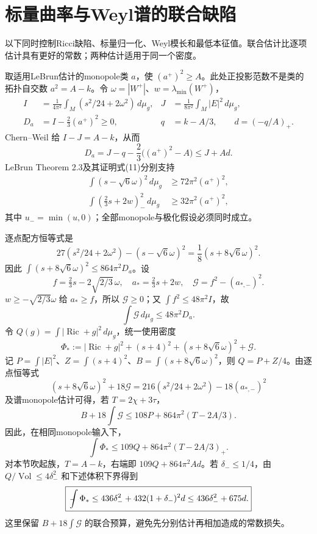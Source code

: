 \documentclass[UTF8,a4paper,11pt,fontset=fandol]{ctexart}
\numberwithin{equation}{section}
\theoremstyle{definition}
\newcommand{\Ric}{\operatorname{Ric}}
\newcommand{\Vol}{\operatorname{Vol}}
\newcommand{\dd}{\,d\mu_g}
\newcommand{\fint}{\mathop{\rlap{\,\raisebox{0.1ex}{\tiny$-$}}\int}\nolimits}
\begin{document}
\section{标量曲率与Weyl谱的联合缺陷}
以下同时控制Ricci缺陷、标量归一化、Weyl模长和最低本征值。联合估计比逐项估计具有更好的常数；两种估计适用于同一个密度。

取适用LeBrun估计的monopole类 $a$，使 $(a^+)^2\ge A$。此处正投影范数不是类的拓扑自交数 $a^2=A-k$。令 $\omega=|W^+|$、$w=\lambda_{\min}(W^+)$，
\begin{align}
 I&=\frac1{4\pi^2}\int_M(s^2/24+2\omega^2)\dd,
 &J&=\frac1{8\pi^2}\int_M|E|^2\dd,\\
 D_a&=I-\frac23(a^+)^2\ge0,
 &q&=k-A/3,\qquad d=(-q/A)_+.
\end{align}
Chern--Weil 给 $I-J=A-k$，从而
\begin{equation}\label{eq:Da}
D_a=J-q-\frac23\big((a^+)^2-A\big)\le J+Ad.
\end{equation}
LeBrun Theorem 2.3及其证明式(11)分别支持
\begin{align}
\int(s-\sqrt6\omega)^2\dd&\ge72\pi^2(a^+)^2,\\
\int\left(\frac23s+2w\right)_{-}^{\!2}\dd&\ge32\pi^2(a^+)^2,
\end{align}
其中 $u_-=\min(u,0)$；全部monopole与极化假设必须同时成立\cite{LeBrun2001}。

逐点配方恒等式是
\begin{equation}\label{eq:square}
27(s^2/24+2\omega^2)-(s-\sqrt6\omega)^2
=\frac18(s+8\sqrt6\omega)^2.
\end{equation}
因此 $\int(s+8\sqrt6\omega)^2\le864\pi^2D_a$。设
\[
f=\tfrac23s-2\sqrt{2/3}\,\omega,\quad a_*=\tfrac23s+2w,
\quad\mathcal G=f^2-(a_{*,-})^2.
\]
$w\ge-\sqrt{2/3}\omega$ 给 $a_*\ge f$，所以 $\mathcal G\ge0$；又 $\int f^2\le48\pi^2I$，故
\begin{equation}
\int\mathcal G\dd\le48\pi^2D_a.
\end{equation}
令 $Q(g)=\int|\Ric+g|^2\dd$，统一使用密度
\begin{equation}\label{eq:Phistar}
\Phi_*:=|\Ric+g|^2+(s+4)^2+(s+8\sqrt6\omega)^2+\mathcal G.
\end{equation}
记 $P=\int|E|^2$、$Z=\int(s+4)^2$、$B=\int(s+8\sqrt6\omega)^2$，则 $Q=P+Z/4$。由逐点恒等式
\begin{equation}\label{eq:joint-density-identity}
(s+8\sqrt6\omega)^2+18\mathcal G
=216(s^2/24+2\omega^2)-18(a_{*,-})^2
\end{equation}
及谱monopole估计可得，若 $T=2\chi+3\tau$，
\[
B+18\int\mathcal G\le108P+864\pi^2(T-2A/3).
\]
因此，在相同monopole输入下，
\begin{equation}\label{eq:109}
\boxed{\int\Phi_*\le109Q+864\pi^2(T-2A/3)_+.}
\end{equation}
对本节吹起族，$T=A-k$，右端即 $109Q+864\pi^2Ad$。若 $\delta_-\le1/4$，由 $Q/\Vol\le4\delta_-^2$ 和下述体积下界得到
\begin{equation}\label{eq:436675}
\boxed{\fint\Phi_*\le436\delta_-^2+432(1+\delta_-)^2d
\le436\delta_-^2+675d.}
\end{equation}
这里保留 $B+18\int\mathcal G$ 的联合预算，避免先分别估计再相加造成的常数损失。
\end{document}
